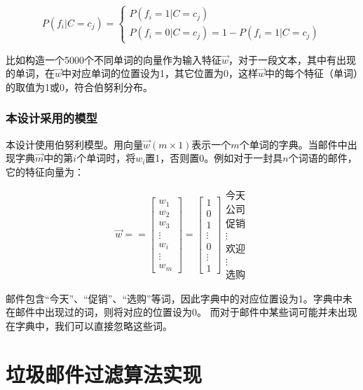 \documentclass[UTF8,zihao=-4]{ctexart}
\begin{document}
	\begin{equation}
    P(f_i|C=c_j)=\begin{cases}
    		{P(f_i=1|C=c_j)} \\ 
    		{P(f_i=0|C=c_j)=1-P(f_i=1|C=c_j)}
    		\end{cases}
	\end{equation}

    比如构造一个5000个不同单词的向量作为输入特征$\vec{w}$，对于一段文本，其中有出现的单词，在$\vec{w}$中对应单词的位置设为1，其它位置为0，这样$\vec{w}$中的每个特征（单词）的取值为1或0，符合伯努利分布。
\subsubsection{本设计采用的模型}
	本设计使用伯努利模型。用向量$\vec{w}(m \times 1)$表示一个$m$个单词的字典。当邮件中出现字典$\vec{m}$中的第$i$个单词时，将$w_i$置1，否则置0。例如对于一封具$n$个词语的邮件，它的特征向量为：
	
	$$
	\vec{w}=
	=
	\begin{bmatrix}
	w_1\\
	w_2\\
	w_3\\
	\vdots\\
	w_i\\
	\vdots\\
	w_m
	\end{bmatrix}
	=
	\begin{bmatrix}
	1\\
	0\\
	1\\
	\vdots\\
	0\\
	\vdots\\
	1
	\end{bmatrix}
	\begin{matrix}
	\text{今天}\\
	\text{公司}\\
	\text{促销}\\
	\vdots\\
	\text{欢迎}\\
	\vdots\\
	\text{选购}
	\end{matrix}
	$$
	
	邮件包含“今天”、“促销”、“选购”等词，因此字典中的对应位置设为1。字典中未在邮件中出现过的词，则将对应的位置设为0。 而对于邮件中某些词可能并未出现在字典中，我们可以直接忽略这些词。
	

\newpage
\section{垃圾邮件过滤算法实现}
\end{document}
